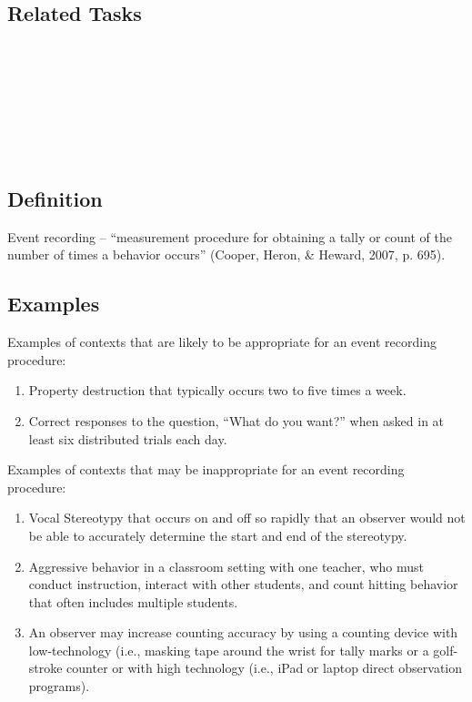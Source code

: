 \subsection{Related Tasks}
\fouraTen{}\\
\fourhOne{}\\
\fourhTwo{}\\
\fourhThree{}\\
\fourhFour{}\\
\fourhFive{}\\
%
%
%
%
%
\section[\fouraTwelve{}]{\fouraTwelve{}%
              }
\subsection{Definition} 
	Event recording – ``measurement procedure for obtaining a tally or count of the number of times a behavior occurs'' (Cooper, Heron, \& Heward, 2007, p. 695).
%  
\subsection{Examples}
Examples of contexts that are likely to be appropriate for an event recording procedure:
\begin{enumerate}
\item Property destruction that typically occurs two to five times a week. 
\item Correct responses to the question, ``What do you want?'' when asked in at least six distributed trials each day. 
\end{enumerate}
Examples of contexts that may be inappropriate for an event recording procedure: 
\begin{enumerate}
\item Vocal Stereotypy that occurs on and off so rapidly that an observer would not be able to accurately determine the start and end of the stereotypy.
\item Aggressive behavior in a classroom setting with one teacher, who must conduct instruction, interact with other students, and count hitting behavior that often includes multiple students.  
\item An observer may increase counting accuracy by using a counting device with low-technology (i.e., masking tape around the wrist for tally marks or a golf-stroke counter or with high technology (i.e., iPad or laptop direct observation programs). 
\end{enumerate}
%
